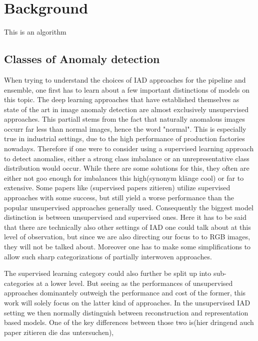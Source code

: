 \chapter{Background}
\label{chap:background}
This is an algorithm 





\section{Classes of Anomaly detection}
When trying to understand the choices of IAD approaches for the pipeline and ensemble, one first has to learn about a few important distinctions of models on this topic.
The deep learning approaches that have established themselves as state of the art in image anomaly detection are almost exclusively unsupervised approaches. This partiall stems from the fact 
that naturally anomalous images occurr far less than normal images, hence the word "normal". This is especially true in industrial settings, due to the high performance of production factories 
nowadays. Therefore if one were to consider using a supervised learning approach to detect anomalies, either a strong class imbalance or an unrepresentative class distribution would occur.
While there are some solutions for this, they often are either not goo enough for imbalances this high(synonym klänge cool) or far to extensive. Some papers like (supervised papers zitieren)
utilize supervised approaches with some success, but still yield a worse performance than the popular unsupervised approaches generally used. Consequently the biggest model distinction is 
between unsupervised and supervised ones. Here it has to be said that there are technically also other settings of IAD one could talk about at this level of observation, but since we are also 
directing our focus to to RGB images, they will not be talked about. Moreover one has to make some simplifications to allow such sharp categorizations of partially interwoven approaches.

The supervised learning category could also further be split up into sub-categories at a lower level. But seeing as the performances of unsupervised approaches dominantely outweigh the 
performance and cost of the former, this work will solely focus on the latter kind of approaches. In the unsupervised IAD setting we then normally distinguish between reconstruction and 
representation based models. One of the key differences between those two is(hier dringend auch paper zitieren die das untersuchen), 


